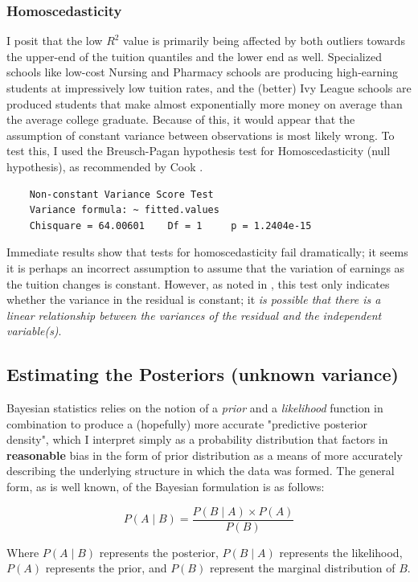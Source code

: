 \documentclass[10pt]{article}
\begin{document}
\subsubsection{Homoscedasticity}
I posit that the low $R^2$ value is primarily being affected by both outliers towards the upper-end of the tuition quantiles and the lower end as well. Specialized schools like low-cost Nursing and Pharmacy schools are producing high-earning students at impressively low tuition rates, and the (better) Ivy League schools are produced students that make almost exponentially more money on average than the average college graduate. Because of this, it would appear that the assumption of constant variance between observations is most likely wrong. To test this, I used the Breusch-Pagan hypothesis test for Homoscedasticity (null hypothesis), as recommended by Cook \cite{cook1983diagnostics}. 
\begin{lstlisting}
	Non-constant Variance Score Test 
	Variance formula: ~ fitted.values 
	Chisquare = 64.00601    Df = 1     p = 1.2404e-15 
\end{lstlisting}

Immediate results show that tests for homoscedasticity fail dramatically; it seems it is perhaps an incorrect assumption to assume that the variation of earnings as the tuition changes is constant. However, as noted in \cite{breusch1979simple}, this test only indicates whether the variance in the residual is constant; it {\it is possible that there is a linear relationship between the variances of the residual and the independent variable(s)}. 

\subsection{Estimating the Posteriors (unknown variance)}
Bayesian statistics relies on the notion of a {\it prior} and a {\it likelihood} function in combination to produce a (hopefully) more accurate "predictive posterior density", which I interpret simply as a probability distribution that factors in {\bf reasonable} bias in the form of prior distribution as a means of more accurately describing the underlying structure in which the data was formed. The general form, as is well known, of the Bayesian formulation is as follows: 

$$ P(A \mid B) = \frac{P(B \mid A) \times P(A)}{ P(B) } $$

Where $P(A \mid B)$ represents the posterior, $P(B \mid A)$ represents the likelihood, $P(A)$ represents the prior, and $P(B)$ represent the marginal distribution of $B$. 
\end{document}
